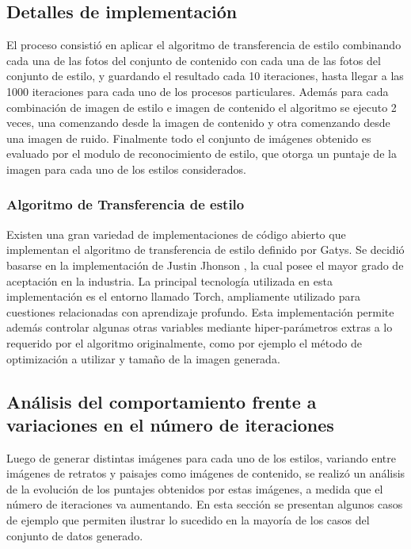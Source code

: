 \documentclass[a4paper,11pt,spanish]{book}
\begin{document}
    \subsection{Detalles de implementación}
      El proceso consistió en aplicar el algoritmo de transferencia de estilo combinando cada una de las fotos del conjunto de contenido con cada una de las fotos del conjunto de estilo,
      y guardando el resultado cada 10 iteraciones, hasta llegar a las 1000 iteraciones para cada uno de los procesos particulares.
      Además para cada combinación de imagen de estilo e imagen de contenido el algoritmo se ejecuto 2 veces, una comenzando desde la imagen de contenido y otra comenzando desde una imagen de ruido.
      Finalmente todo el conjunto de imágenes obtenido es evaluado por el modulo de reconocimiento de estilo, que otorga un puntaje de la imagen para cada uno de los estilos considerados.
      \subsubsection{Algoritmo de Transferencia de estilo}
	Existen una gran variedad de implementaciones de código abierto que implementan el algoritmo de transferencia de estilo definido por Gatys.
	Se decidió basarse en la implementación de Justin Jhonson \cite{Johnson:Neural_Style}, la cual posee el mayor grado de aceptación en la industria.
	La principal tecnología utilizada en esta implementación es el entorno llamado Torch, ampliamente utilizado para cuestiones relacionadas con aprendizaje profundo.
	Esta implementación permite además controlar algunas otras variables mediante hiper-parámetros extras a lo requerido por el algoritmo originalmente, 
	como por ejemplo el método de optimización a utilizar y tamaño de la imagen generada.

    \subsection{Análisis del comportamiento frente a variaciones en el número de iteraciones }
      Luego de generar distintas imágenes para cada uno de los estilos, variando entre imágenes de retratos y paisajes como imágenes de contenido, se realizó un análisis
      de la evolución de los puntajes obtenidos por estas imágenes, a medida que el número de iteraciones va aumentando. En esta sección se presentan algunos casos de ejemplo
      que permiten ilustrar lo sucedido en la mayoría de los casos del conjunto de datos generado.
      
\end{document}
